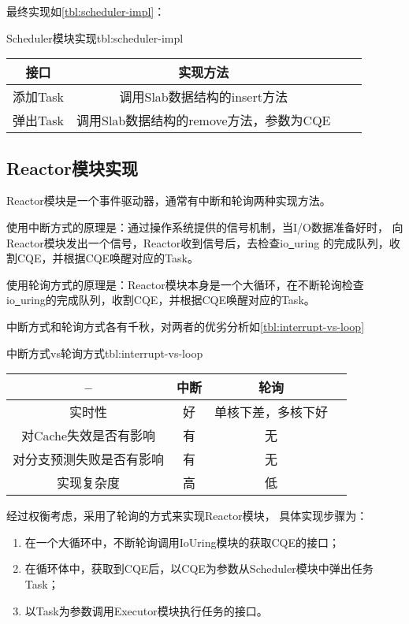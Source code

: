 \documentclass[supercite]{HustGraduPaper}
\newcommand{\rtbl}[1]{\autoref{tbl:#1}}
\theoremstyle{definition}
\begin{document}
最终实现如\rtbl{scheduler-impl}：

\begin{generaltab}{Scheduler模块实现}{tbl:scheduler-impl}
  \begin{tabular}{c|ccc}
    \toprule
    接口 & 实现方法 \\
    \midrule
    添加Task & 调用Slab数据结构的insert方法\\
    弹出Task & 调用Slab数据结构的remove方法，参数为CQE\\
    \bottomrule
  \end{tabular}
\end{generaltab}

\subsection{Reactor模块实现}

Reactor模块是一个事件驱动器，通常有中断和轮询两种实现方法。\par

使用中断方式的原理是：通过操作系统提供的信号机制，当I/O数据准备好时，
向Reactor模块发出一个信号，Reactor收到信号后，去检查io\underline{~}uring
的完成队列，收割CQE，并根据CQE唤醒对应的Task。\par

使用轮询方式的原理是：Reactor模块本身是一个大循环，在不断轮询检查
io\underline{~}uring的完成队列，收割CQE，并根据CQE唤醒对应的Task。\par

中断方式和轮询方式各有千秋，对两者的优劣分析如\rtbl{interrupt-vs-loop}

\begin{generaltab}{中断方式vs轮询方式}{tbl:interrupt-vs-loop}
  \begin{tabular}{c|ccc}
    \toprule
    -- & 中断 & 轮询 \\
    \midrule
    实时性 & 好 & 单核下差，多核下好\\
    对Cache失效是否有影响 & 有 & 无\\
    对分支预测失败是否有影响 & 有 & 无\\
    实现复杂度 & 高 & 低\\
    \bottomrule
  \end{tabular}
\end{generaltab}

经过权衡考虑，采用了轮询的方式来实现Reactor模块，
具体实现步骤为：

\begin{enumerate}[label={(\arabic*)}]
  \item 在一个大循环中，不断轮询调用IoUring模块的获取CQE的接口；
  \item 在循环体中，获取到CQE后，以CQE为参数从Scheduler模块中弹出任务Task；
  \item 以Task为参数调用Executor模块执行任务的接口。
\end{enumerate}
\end{document}
